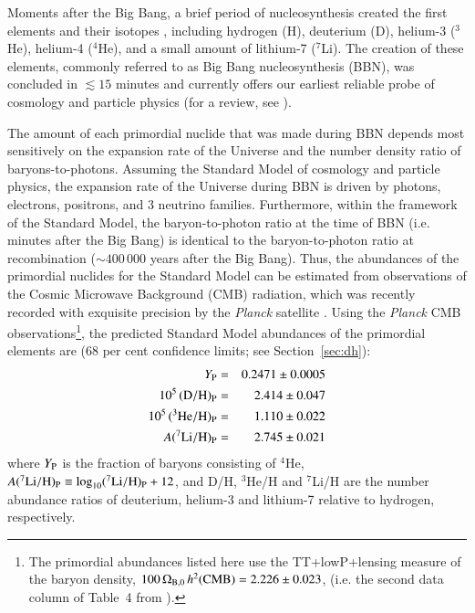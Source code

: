 \documentclass[12pt,preprint,useAMS,usenatbib]{emulateapj}
\begin{document}
\setcounter{footnote}{8}

Moments after the Big Bang, a brief period of nucleosynthesis created
the first elements and their isotopes
\citep{HoyTay64,Pee66,WagFowHoy67},
including hydrogen (H), deuterium (D), helium-3 ($^{3}$He), helium-4 ($^{4}$He),
and a small amount of lithium-7 ($^{7}$Li).
The creation of these elements, commonly referred to
as Big Bang nucleosynthesis (BBN), was concluded in
$\lesssim15$ minutes
and currently offers our earliest reliable probe of cosmology
and particle physics (for a review, see \citealt{Ste07,Ioc09,Ste12,Cyb15}).

The amount of each primordial nuclide that was made during
BBN depends most sensitively on the expansion rate of the
Universe and the number density ratio of baryons-to-photons.
Assuming the Standard Model of cosmology and particle physics,
the expansion rate of the Universe during BBN is driven by photons,
electrons, positrons, and 3 neutrino families. Furthermore, within the
framework of the Standard Model, the baryon-to-photon ratio at the
time of BBN (i.e. minutes after the Big Bang) is identical to the
baryon-to-photon ratio at recombination ($\sim400\,000$ years after
the Big Bang). Thus, the abundances of the primordial nuclides for
the Standard Model can be estimated from observations of the Cosmic
Microwave Background (CMB) radiation, which was recently recorded
with exquisite precision by the \textit{Planck} satellite \citep{Efs15}.
Using the \textit{Planck} CMB observations\footnote{The primordial
abundances listed here use the
TT+lowP+lensing measure of the baryon density,
$100\,\Omega_{\rm B,0}\,h^{2}({\rm CMB})=2.226\pm0.023$,
 (i.e. the second data column of Table~4 from \citealt{Efs15}).},
 the predicted Standard
Model abundances of the primordial elements are
(68 per cent confidence limits; see Section~\ref{sec:dh}):
\begin{eqnarray}
Y_{\rm P}&=&0.2471\pm0.0005\nonumber\\
10^{5}\,({\rm D/H})_{\rm P}&=&2.414\pm0.047\nonumber\\
10^{5}\,({\rm ^{3}He/H})_{\rm P}&=&1.110\pm0.022\nonumber\\
A(^{7}{\rm Li/H})_{\rm P}&=&2.745\pm0.021\nonumber
\end{eqnarray}
where $Y_{\rm P}$ is the fraction of baryons consisting
of $^{4}$He, $A(^{7}{\rm Li/H})_{\rm P}\equiv\log_{10}(^{7}{\rm Li/H})_{\rm P}+12$,
and D/H, $^{3}$He/H and $^{7}$Li/H are the number abundance ratios
of deuterium, helium-3 and lithium-7 relative to hydrogen, respectively.
\end{document}
